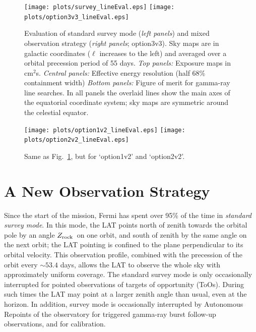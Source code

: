 \documentclass[aps,prd,superscriptaddress,nofootinbib,fixlfloat, 12pt]{revtex4-1}
\newcommand{\Fermi}{{\slshape Fermi}}
\newcommand{\zrock}{$Z_{\rm rock}$}
\begin{document}
\begin{figure}[t]
  \begin{center}
    \texttt{[image: plots/survey\_lineEval.eps]}
    \texttt{[image: plots/option3v3\_lineEval.eps]}
    \vspace{-0.5cm}
  \end{center}
  \caption{Evaluation of standard survey mode (\emph{left panels}) and mixed observation
    strategy (\emph{right panels}; option3v3). Sky maps are in galactic coordinates ($\ell$ increases
    to the left) and averaged over a orbital precession period of 55 days.
    \emph{Top
      panels:} Exposure maps in cm$^2$s.
    \emph{Central panels:}
    Effective energy resolution (half 68\% containment width)
  \emph{Bottom panels:} Figure of merit for gamma-ray line searches. In all
  panels the overlaid lines show the main axes of the equatorial coordinate
  system; sky maps are symmetric around the celestial equator.}
  \label{fig:mollweide}
\end{figure}

\begin{figure}[t]
  \begin{center}
    \texttt{[image: plots/option1v2\_lineEval.eps]}
    \texttt{[image: plots/option2v2\_lineEval.eps]}
    \vspace{-0.5cm}
  \end{center}
  \caption{Same as Fig.~\ref{fig:mollweide}, but for `option1v2' and
  `option2v2'.}
  \label{fig:mollweide2}
\end{figure}

\section{A New Observation Strategy}
Since the start of the mission, Fermi has spent over 95\% of the time in
\emph{standard survey mode}.
In this mode, the LAT points north of zenith towards the orbital pole by an
angle \zrock\ on one orbit, and south of zenith by the same angle on the next
orbit; the LAT pointing is confined to the plane perpendicular to its orbital
velocity. 
This observation profile, combined with the precession of the orbit every
$\sim53.4$ days, allows the LAT to observe the whole sky with approximately
uniform coverage. The standard survey mode is only occasionally interrupted
for pointed observations of targets of opportunity (ToOs). During such times
the LAT may point at a larger zenith angle than usual, even at the horizon.  In
addition, survey mode is occasionally interrupted by Autonomous Repoints of
the observatory for triggered gamma-ray burst follow-up observations, and for
calibration.
\end{document}

